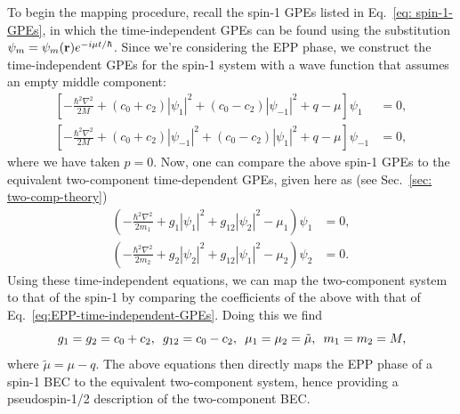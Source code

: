 To begin the mapping procedure, recall the spin-1 GPEs listed in
Eq.~\eqref{eq: spin-1-GPEs}, in which the time-independent GPEs can be found
using the substitution \(\psi_m = \psi_m(\vb{r})e^{-i\mu t/\hbar}\).
Since we're considering the EPP phase, we construct the time-independent
GPEs for the spin-1 system with a wave function that assumes an empty middle
component:
\begin{equation}
    \begin{aligned}
        \left[-\frac{\hbar^2\nabla^2}{2M}
            + (c_0 + c_2)|\psi_1|^2 + (c_0 - c_2)|\psi_{-1}|^2
        + q - \mu\right]\psi_1    & = 0, \\
        \left[-\frac{\hbar^2\nabla^2}{2M}
            + (c_0 + c_2)|\psi_{-1}|^2 + (c_0 - c_2)|\psi_1|^2
        + q - \mu\right]\psi_{-1} & = 0,
    \end{aligned}
    \label{eq:EPP-time-independent-GPEs}
\end{equation}
where we have taken \( p=0 \).
Now, one can compare the above spin-1 GPEs to the equivalent two-component
time-dependent GPEs, given here as (see Sec.~\ref{sec: two-comp-theory})
\begin{equation}
    \begin{aligned}
        \left(-\frac{\hbar^2\nabla^2}{2m_1} + g_1|\psi_1|^2
        +g_{12}|\psi_2|^2 - \mu_1\right)\psi_1 & = 0, \\
        \left(-\frac{\hbar^2\nabla^2}{2m_2} + g_2|\psi_2|^2
        +g_{12}|\psi_1|^2 - \mu_2\right)\psi_2 & = 0.
    \end{aligned}
    \label{eq:two-comp-time-independent-gpes}
\end{equation}
Using these time-independent equations, we can map the two-component system
to that of the spin-1 by comparing the coefficients of the above with that of
Eq.~\eqref{eq:EPP-time-independent-GPEs}.
Doing this we find
\begin{equation}
    g_1=g_2=c_0+c_2, \enskip g_{12} = c_0-c_2, \enskip \mu_1=\mu_2=\tilde{\mu},
    \enskip m_1=m_2=M,
\end{equation}
where \( \tilde{\mu} = \mu - q \).
The above equations then directly maps the EPP phase of a spin-1 BEC to the
equivalent two-component system, hence providing a pseudospin-1/2 description
of the two-component BEC\@.

